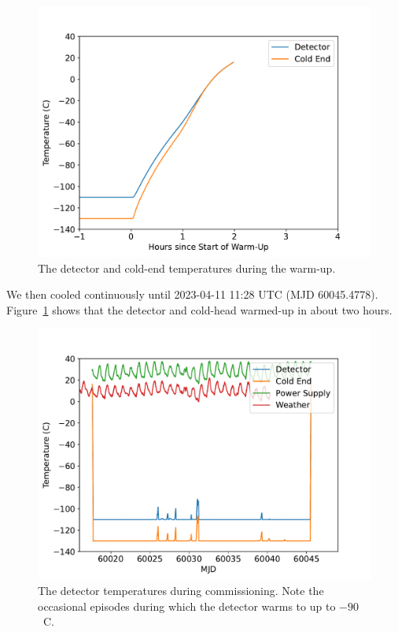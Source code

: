 \documentclass{article}
\begin{document}
\begin{figure}[pb]
\begin{center}
\includegraphics[width=0.7\columnwidth]{figures/warm-up.pdf}
\medskip
\caption{The detector and cold-end temperatures during the warm-up.}
\label{figure:warm-up}
\end{center}
\end{figure}

We then cooled continuously until 2023-04-11 11:28 UTC (MJD 60045.4778). Figure~\ref{figure:warm-up} shows that the detector and cold-head warmed-up in about two hours.

\begin{figure}[pb]
\begin{center}
\includegraphics[width=0.7\columnwidth]{figures/temperature-stability-a.pdf}
\medskip
\caption{The detector temperatures during commissioning. Note the occasional episodes during which the detector warms to up to $-90$~C.}
\label{figure:temperature-stability-a}
\end{center}
\end{figure}
\end{document}

